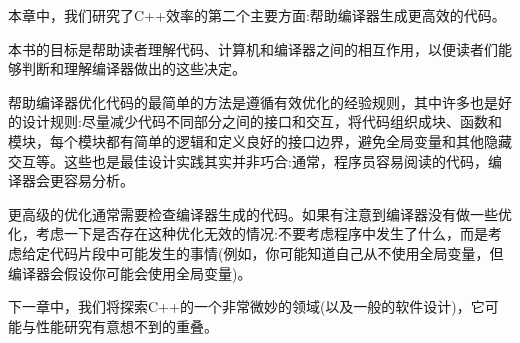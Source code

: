 本章中，我们研究了C++效率的第二个主要方面:帮助编译器生成更高效的代码。 

本书的目标是帮助读者理解代码、计算机和编译器之间的相互作用，以便读者们能够判断和理解编译器做出的这些决定。 

帮助编译器优化代码的最简单的方法是遵循有效优化的经验规则，其中许多也是好的设计规则:尽量减少代码不同部分之间的接口和交互，将代码组织成块、函数和模块，每个模块都有简单的逻辑和定义良好的接口边界，避免全局变量和其他隐藏交互等。这些也是最佳设计实践其实并非巧合:通常，程序员容易阅读的代码，编译器会更容易分析。

更高级的优化通常需要检查编译器生成的代码。如果有注意到编译器没有做一些优化，考虑一下是否存在这种优化无效的情况:不要考虑程序中发生了什么，而是考虑给定代码片段中可能发生的事情(例如，你可能知道自己从不使用全局变量，但编译器会假设你可能会使用全局变量)。 

下一章中，我们将探索C++的一个非常微妙的领域(以及一般的软件设计)，它可能与性能研究有意想不到的重叠。